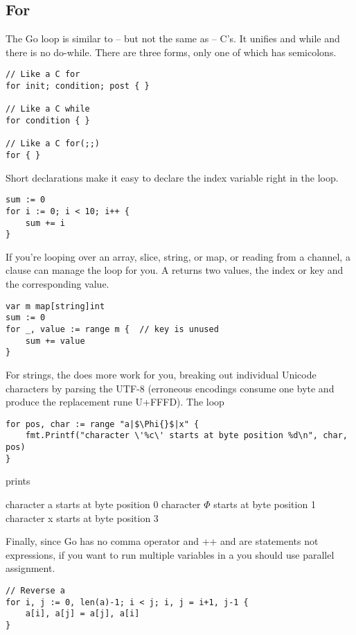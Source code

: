 \subsection{For}
The Go  loop is similar to -- but not the same as -- C's. It
unifies 
and while and there is no do-while. There are three forms, only one of
which has semicolons.
\begin{lstlisting}
// Like a C for
for init; condition; post { }

// Like a C while
for condition { }

// Like a C for(;;)
for { }
\end{lstlisting}
Short declarations make it easy to declare the index variable right in the loop.
\begin{lstlisting}
sum := 0
for i := 0; i < 10; i++ {
    sum += i
}
\end{lstlisting}
If you're looping over an array, slice, string, or map, or reading from
a channel, a  clause can manage the loop for you. A
 returns two values, the index or key and the 
corresponding value.
\begin{lstlisting}
var m map[string]int
sum := 0
for _, value := range m {  // key is unused
    sum += value
}
\end{lstlisting}
For strings, the  does more work for you, breaking out individual
Unicode characters by parsing the UTF-8 (erroneous encodings consume one
byte and produce the replacement rune U+FFFD). The loop

\begin{lstlisting}
for pos, char := range "a|$\Phi{}$|x" {
    fmt.Printf("character \'%c\' starts at byte position %d\n", char, pos)
}
\end{lstlisting}
prints
\begin{display}
character a starts at byte position 0
character \begin{math}\Phi\end{math} starts at byte position 1
character x starts at byte position 3
\end{display}
Finally, since Go has no comma operator and ++ and \-\- are statements not
expressions, if you want to run multiple variables in a  you should
use parallel assignment.
\begin{lstlisting}
// Reverse a
for i, j := 0, len(a)-1; i < j; i, j = i+1, j-1 {
    a[i], a[j] = a[j], a[i]
}
\end{lstlisting}

